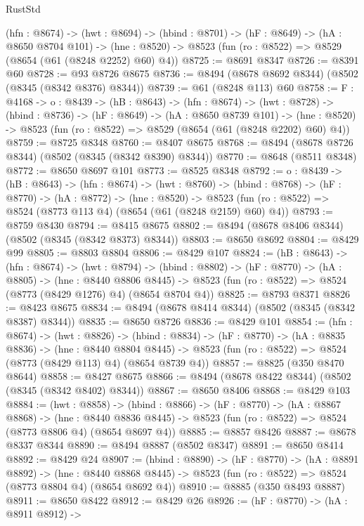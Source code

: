 \begin{lexlean}{RustStd}
\begin{coremodule}
  (hfn : @8674) ->
  (hwt : @8694) ->
  (hbind : @8701) ->
  (hF : @8649) ->
  (hA : @8650 @8704 @101) ->
  (hne : @8520) -> @8523 (fun (ro : @8522) => @8529 (@8654 (@61 (@8248 @2252) @60) @4))
@8725 := @8691 @8347
@8726 := @8391 @60
@8728 := @93 @8726 @8675
@8736 := @8494 (@8678 @8692 @8344) (@8502 (@8345 (@8342 @8376) @8344))
@8739 := @61 (@8248 @113) @60
@8758 := {F : @4168} ->
  {o : @8439} ->
  (hB : @8643) ->
  (hfn : @8674) ->
  (hwt : @8728) ->
  (hbind : @8736) ->
  (hF : @8649) ->
  (hA : @8650 @8739 @101) ->
  (hne : @8520) -> @8523 (fun (ro : @8522) => @8529 (@8654 (@61 (@8248 @2202) @60) @4))
@8759 := @8725 @8348
@8760 := @8407 @8675
@8768 := @8494 (@8678 @8726 @8344) (@8502 (@8345 (@8342 @8390) @8344))
@8770 := @8648 (@8511 @8348)
@8772 := @8650 @8697 @101
@8773 := @8525 @8348
@8792 := {o : @8439} ->
  (hB : @8643) ->
  (hfn : @8674) ->
  (hwt : @8760) ->
  (hbind : @8768) ->
  (hF : @8770) ->
  (hA : @8772) ->
  (hne : @8520) ->
  @8523 (fun (ro : @8522) => @8524 (@8773 @113 @4) (@8654 (@61 (@8248 @2159) @60) @4))
@8793 := @8759 @8430
@8794 := @8415 @8675
@8802 := @8494 (@8678 @8406 @8344) (@8502 (@8345 (@8342 @8373) @8344))
@8803 := @8650 @8692
@8804 := @8429 @99
@8805 := @8803 @8804
@8806 := @8429 @107
@8824 := (hB : @8643) ->
  (hfn : @8674) ->
  (hwt : @8794) ->
  (hbind : @8802) ->
  (hF : @8770) ->
  (hA : @8805) ->
  (hne : @8440 @8806 @8445) ->
  @8523 (fun (ro : @8522) => @8524 (@8773 (@8429 @1276) @4) (@8654 @8704 @4))
@8825 := @8793 @8371
@8826 := @8423 @8675
@8834 := @8494 (@8678 @8414 @8344) (@8502 (@8345 (@8342 @8387) @8344))
@8835 := @8650 @8726
@8836 := @8429 @101
@8854 := (hfn : @8674) ->
  (hwt : @8826) ->
  (hbind : @8834) ->
  (hF : @8770) ->
  (hA : @8835 @8836) ->
  (hne : @8440 @8804 @8445) ->
  @8523 (fun (ro : @8522) => @8524 (@8773 (@8429 @113) @4) (@8654 @8739 @4))
@8857 := @8825 (@350 @8470 @8644)
@8858 := @8427 @8675
@8866 := @8494 (@8678 @8422 @8344) (@8502 (@8345 (@8342 @8402) @8344))
@8867 := @8650 @8406
@8868 := @8429 @103
@8884 := (hwt : @8858) ->
  (hbind : @8866) ->
  (hF : @8770) ->
  (hA : @8867 @8868) ->
  (hne : @8440 @8836 @8445) -> @8523 (fun (ro : @8522) => @8524 (@8773 @8806 @4) (@8654 @8697 @4))
@8885 := @8857 @8426
@8887 := @8678 @8337 @8344
@8890 := @8494 @8887 (@8502 @8347)
@8891 := @8650 @8414
@8892 := @8429 @24
@8907 := (hbind : @8890) ->
  (hF : @8770) ->
  (hA : @8891 @8892) ->
  (hne : @8440 @8868 @8445) -> @8523 (fun (ro : @8522) => @8524 (@8773 @8804 @4) (@8654 @8692 @4))
@8910 := @8885 (@350 @8493 @8887)
@8911 := @8650 @8422
@8912 := @8429 @26
@8926 := (hF : @8770) ->
  (hA : @8911 @8912) ->

\end{coremodule}
\end{lexlean}
